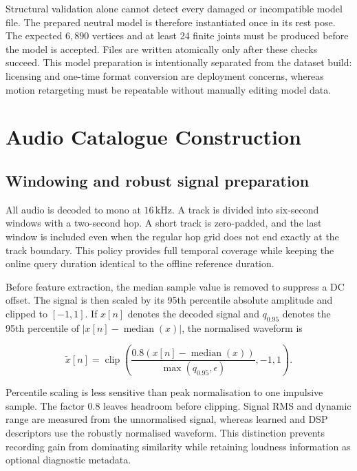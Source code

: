 Structural validation alone cannot detect every damaged or incompatible model
file. The prepared neutral model is therefore instantiated once in its rest
pose. The expected $6{,}890$ vertices and at least 24 finite joints must be
produced before the model is accepted. Files are written atomically only after
these checks succeed. This model preparation is intentionally separated from
the dataset build: licensing and one-time format conversion are deployment
concerns, whereas motion retargeting must be repeatable without manually
editing model data.

\section{Audio Catalogue Construction}
\label{sec:audio_catalogue}

\subsection{Windowing and robust signal preparation}
\label{subsec:audio_windowing}

All audio is decoded to mono at $16\,\mathrm{kHz}$. A track is divided into
six-second windows with a two-second hop. A short track is zero-padded, and the
last window is included even when the regular hop grid does not end exactly at
the track boundary. This policy provides full temporal coverage while keeping
the online query duration identical to the offline reference duration.

Before feature extraction, the median sample value is removed to suppress a DC
offset. The signal is then scaled by its 95th percentile absolute amplitude and
clipped to $[-1,1]$. If $x[n]$ denotes the decoded signal and
$q_{0.95}$ denotes the 95th percentile of
$|x[n]-\operatorname{median}(x)|$, the normalised waveform is

\begin{equation}
    \widetilde{x}[n]
    = \operatorname{clip}\!\left(
        \frac{0.8\left(x[n]-\operatorname{median}(x)\right)}
             {\max(q_{0.95},\epsilon)},-1,1
      \right).
    \label{eq:offline_robust_audio_normalisation}
\end{equation}

Percentile scaling is less sensitive than peak normalisation to one impulsive
sample. The factor $0.8$ leaves headroom before clipping. Signal RMS and dynamic
range are measured from the unnormalised signal, whereas learned and DSP
descriptors use the robustly normalised waveform. This distinction prevents
recording gain from dominating similarity while retaining loudness information
as optional diagnostic metadata.

